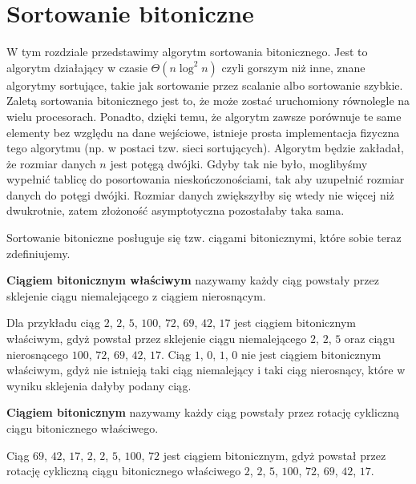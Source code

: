 \section{Sortowanie bitoniczne}

\label{sec:bitoniczne}

W tym rozdziale przedstawimy algorytm sortowania bitonicznego.
Jest to algorytm działający w czasie $\Theta(n \log^2 n)$ czyli gorszym niż inne, znane algorytmy sortujące, takie jak sortowanie przez scalanie albo sortowanie szybkie.
Zaletą sortowania bitonicznego jest to, że może zostać uruchomiony równolegle na wielu procesorach.
Ponadto, dzięki temu, że algorytm zawsze porównuje te same elementy bez względu na dane wejściowe, istnieje prosta implementacja fizyczna tego algorytmu (np. w postaci tzw. sieci sortujących).
Algorytm będzie zakładał, że rozmiar danych $n$ jest potęgą dwójki.
Gdyby tak nie było, moglibyśmy wypełnić tablicę do posortowania nieskończonościami, tak aby uzupełnić rozmiar danych do potęgi dwójki.
Rozmiar danych zwiększyłby się wtedy nie więcej niż dwukrotnie, zatem złożoność asymptotyczna pozostałaby taka sama.

Sortowanie bitoniczne posługuje się tzw. ciągami bitonicznymi, które sobie teraz zdefiniujemy.
\begin{definition}
 \textbf{Ciągiem bitonicznym właściwym} nazywamy każdy ciąg powstały przez sklejenie ciągu niemalejącego z ciągiem nierosnącym.
\end{definition}
Dla przykładu ciąg $2$, $2$, $5$, $100$, $72$, $69$, $42$, $17$ jest ciągiem bitonicznym właściwym, gdyż powstał przez sklejenie ciągu niemalejącego $2$, $2$, $5$ oraz ciągu nierosnącego $100$, $72$, $69$, $42$, $17$.
Ciąg $1$, $0$, $1$, $0$ nie jest ciągiem bitonicznym właściwym, gdyż nie istnieją taki ciąg niemalejący i taki ciąg nierosnący, które w wyniku sklejenia dałyby podany ciąg.
\begin{definition}
 \textbf{Ciągiem bitonicznym} nazywamy każdy ciąg powstały przez rotację cykliczną ciągu bitonicznego właściwego.
\end{definition}
Ciąg $69$, $42$, $17$, $2$, $2$, $5$, $100$, $72$ jest ciągiem bitonicznym, gdyż powstał przez rotację cykliczną ciągu bitonicznego właściwego $2$, $2$, $5$, $100$, $72$, $69$, $42$, $17$.

